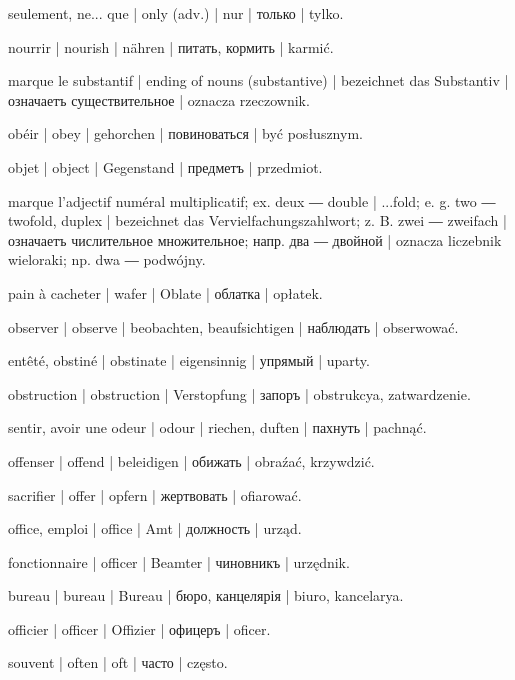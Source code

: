 \begin{outdent}{1em}
seulement, ne... que | only (adv.) | nur | только | tylko.

nourrir | nourish | nähren | питать, кормить | karmić.


marque le substantif | ending of nouns (substantive) | bezeichnet
das Substantiv | означаетъ существительное | oznacza rzeczownik.

obéir | obey | gehorchen | повиноваться | być posłusznym.

objet | object | Gegenstand | предметъ | przedmiot.

marque l’adjectif numéral multiplicatif; ex.  deux ―
 double | ...fold; e. g.  two ―  twofold,
duplex | bezeichnet das Vervielfachungszahlwort; z. B.  zwei ―
 zweifach | означаетъ числительное множительное; напр. 
два ―  двойной | oznacza liczebnik wieloraki; np.  dwa
―  podwójny.

pain à cacheter | wafer | Oblate | облатка | opłatek.

observer | observe | beobachten, beaufsichtigen | наблюдать | obserwować.

entêté, obstiné | obstinate | eigensinnig | упрямый | uparty.

obstruction | obstruction | Verstopfung | запоръ | obstrukcya, zatwardzenie.

sentir, avoir une odeur | odour | riechen, duften | пахнуть | pachnąć.

offenser | offend | beleidigen | обижать | obraźać,
krzywdzić.

sacrifier | offer | opfern | жертвовать | ofiarować.

office, emploi | office | Amt | должность | urząd.

\uvsubentry{}
fonctionnaire | officer | Beamter | чиновникъ | urzędnik.


\uvsubentry{}
bureau | bureau | Bureau | бюро, канцелярія | biuro, kancelarya.

officier | officer | Offizier | офицеръ | oficer.

souvent | often | oft | часто | często.


\end{outdent}
